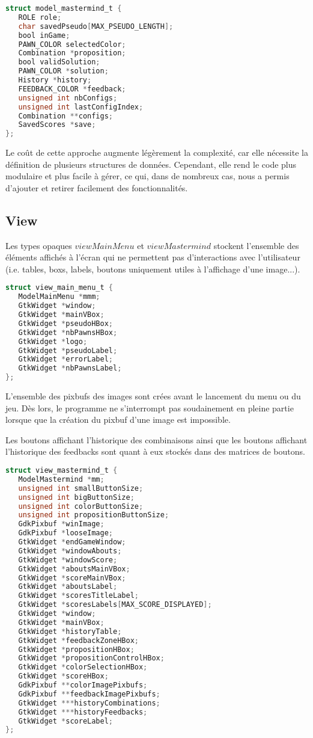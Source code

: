 \newpage

\begin{lstlisting}[language=C]
struct model_mastermind_t {
   ROLE role;
   char savedPseudo[MAX_PSEUDO_LENGTH];
   bool inGame;
   PAWN_COLOR selectedColor;
   Combination *proposition;
   bool validSolution;
   PAWN_COLOR *solution;
   History *history;
   FEEDBACK_COLOR *feedback;
   unsigned int nbConfigs;
   unsigned int lastConfigIndex;
   Combination **configs;
   SavedScores *save;
};
\end{lstlisting}
Le coût de cette approche augmente légèrement la complexité, car elle nécessite la définition de plusieurs structures de données. Cependant, elle rend le code plus modulaire et plus facile à gérer, ce qui, dans de nombreux cas, nous a permis d'ajouter et retirer facilement des fonctionnalités.

\subsection{View}
Les types opaques $viewMainMenu$ et $viewMastermind$ stockent l'ensemble des éléments affichés à l'écran qui ne permettent pas d'interactions avec l'utilisateur (i.e. tables, boxs, labels, boutons uniquement utiles à l'affichage d'une image...).

\begin{lstlisting}[language=C]
struct view_main_menu_t {
   ModelMainMenu *mmm;
   GtkWidget *window;
   GtkWidget *mainVBox;
   GtkWidget *pseudoHBox;
   GtkWidget *nbPawnsHBox;
   GtkWidget *logo;
   GtkWidget *pseudoLabel;
   GtkWidget *errorLabel;
   GtkWidget *nbPawnsLabel;
};
\end{lstlisting}

L'ensemble des pixbufs des images sont crées avant le lancement du menu ou du jeu. Dès lors, le programme ne s'interrompt pas soudainement en pleine partie lorsque que la création du pixbuf d'une image est impossible.  

Les boutons affichant l'historique des combinaisons ainsi que les boutons affichant l'historique des feedbacks sont quant à eux stockés dans des matrices de boutons.

\begin{lstlisting}[language=C]
struct view_mastermind_t {
   ModelMastermind *mm;
   unsigned int smallButtonSize;
   unsigned int bigButtonSize;
   unsigned int colorButtonSize;
   unsigned int propositionButtonSize;
   GdkPixbuf *winImage;
   GdkPixbuf *looseImage;
   GtkWidget *endGameWindow;
   GtkWidget *windowAbouts;
   GtkWidget *windowScore;
   GtkWidget *aboutsMainVBox;
   GtkWidget *scoreMainVBox;
   GtkWidget *aboutsLabel;
   GtkWidget *scoresTitleLabel;
   GtkWidget *scoresLabels[MAX_SCORE_DISPLAYED];
   GtkWidget *window;
   GtkWidget *mainVBox;
   GtkWidget *historyTable;
   GtkWidget *feedbackZoneHBox;
   GtkWidget *propositionHBox;
   GtkWidget *propositionControlHBox;
   GtkWidget *colorSelectionHBox;
   GtkWidget *scoreHBox;
   GdkPixbuf **colorImagePixbufs;
   GdkPixbuf **feedbackImagePixbufs;
   GtkWidget ***historyCombinations;
   GtkWidget ***historyFeedbacks;
   GtkWidget *scoreLabel;
};
\end{lstlisting}


